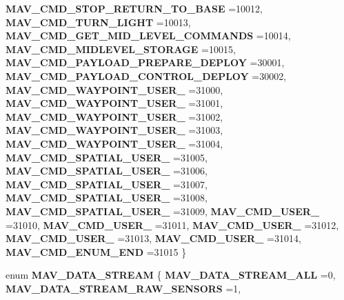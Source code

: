 \begin{DoxyCompactItemize}
\textbf{ M\+A\+V\+\_\+\+C\+M\+D\+\_\+\+S\+T\+O\+P\+\_\+\+R\+E\+T\+U\+R\+N\+\_\+\+T\+O\+\_\+\+B\+A\+SE} =10012, 
\textbf{ M\+A\+V\+\_\+\+C\+M\+D\+\_\+\+T\+U\+R\+N\+\_\+\+L\+I\+G\+HT} =10013, 
\textbf{ M\+A\+V\+\_\+\+C\+M\+D\+\_\+\+G\+E\+T\+\_\+\+M\+I\+D\+\_\+\+L\+E\+V\+E\+L\+\_\+\+C\+O\+M\+M\+A\+N\+DS} =10014, 
\newline
\textbf{ M\+A\+V\+\_\+\+C\+M\+D\+\_\+\+M\+I\+D\+L\+E\+V\+E\+L\+\_\+\+S\+T\+O\+R\+A\+GE} =10015, 
\textbf{ M\+A\+V\+\_\+\+C\+M\+D\+\_\+\+P\+A\+Y\+L\+O\+A\+D\+\_\+\+P\+R\+E\+P\+A\+R\+E\+\_\+\+D\+E\+P\+L\+OY} =30001, 
\textbf{ M\+A\+V\+\_\+\+C\+M\+D\+\_\+\+P\+A\+Y\+L\+O\+A\+D\+\_\+\+C\+O\+N\+T\+R\+O\+L\+\_\+\+D\+E\+P\+L\+OY} =30002, 
\textbf{ M\+A\+V\+\_\+\+C\+M\+D\+\_\+\+W\+A\+Y\+P\+O\+I\+N\+T\+\_\+\+U\+S\+E\+R\+\_} =31000, 
\newline
\textbf{ M\+A\+V\+\_\+\+C\+M\+D\+\_\+\+W\+A\+Y\+P\+O\+I\+N\+T\+\_\+\+U\+S\+E\+R\+\_} =31001, 
\textbf{ M\+A\+V\+\_\+\+C\+M\+D\+\_\+\+W\+A\+Y\+P\+O\+I\+N\+T\+\_\+\+U\+S\+E\+R\+\_} =31002, 
\textbf{ M\+A\+V\+\_\+\+C\+M\+D\+\_\+\+W\+A\+Y\+P\+O\+I\+N\+T\+\_\+\+U\+S\+E\+R\+\_} =31003, 
\textbf{ M\+A\+V\+\_\+\+C\+M\+D\+\_\+\+W\+A\+Y\+P\+O\+I\+N\+T\+\_\+\+U\+S\+E\+R\+\_} =31004, 
\newline
\textbf{ M\+A\+V\+\_\+\+C\+M\+D\+\_\+\+S\+P\+A\+T\+I\+A\+L\+\_\+\+U\+S\+E\+R\+\_} =31005, 
\textbf{ M\+A\+V\+\_\+\+C\+M\+D\+\_\+\+S\+P\+A\+T\+I\+A\+L\+\_\+\+U\+S\+E\+R\+\_} =31006, 
\textbf{ M\+A\+V\+\_\+\+C\+M\+D\+\_\+\+S\+P\+A\+T\+I\+A\+L\+\_\+\+U\+S\+E\+R\+\_} =31007, 
\textbf{ M\+A\+V\+\_\+\+C\+M\+D\+\_\+\+S\+P\+A\+T\+I\+A\+L\+\_\+\+U\+S\+E\+R\+\_} =31008, 
\newline
\textbf{ M\+A\+V\+\_\+\+C\+M\+D\+\_\+\+S\+P\+A\+T\+I\+A\+L\+\_\+\+U\+S\+E\+R\+\_} =31009, 
\textbf{ M\+A\+V\+\_\+\+C\+M\+D\+\_\+\+U\+S\+E\+R\+\_} =31010, 
\textbf{ M\+A\+V\+\_\+\+C\+M\+D\+\_\+\+U\+S\+E\+R\+\_} =31011, 
\textbf{ M\+A\+V\+\_\+\+C\+M\+D\+\_\+\+U\+S\+E\+R\+\_} =31012, 
\newline
\textbf{ M\+A\+V\+\_\+\+C\+M\+D\+\_\+\+U\+S\+E\+R\+\_} =31013, 
\textbf{ M\+A\+V\+\_\+\+C\+M\+D\+\_\+\+U\+S\+E\+R\+\_} =31014, 
\textbf{ M\+A\+V\+\_\+\+C\+M\+D\+\_\+\+E\+N\+U\+M\+\_\+\+E\+ND} =31015
 \}
\item 
enum \textbf{ M\+A\+V\+\_\+\+D\+A\+T\+A\+\_\+\+S\+T\+R\+E\+AM} \{ \newline
\textbf{ M\+A\+V\+\_\+\+D\+A\+T\+A\+\_\+\+S\+T\+R\+E\+A\+M\+\_\+\+A\+LL} =0, 
\textbf{ M\+A\+V\+\_\+\+D\+A\+T\+A\+\_\+\+S\+T\+R\+E\+A\+M\+\_\+\+R\+A\+W\+\_\+\+S\+E\+N\+S\+O\+RS} =1, 

\end{DoxyCompactItemize}
